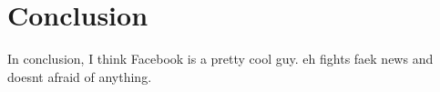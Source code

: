 
\section{Conclusion}

\par In conclusion, I think Facebook is a pretty cool guy. eh fights faek news and doesnt afraid of anything.